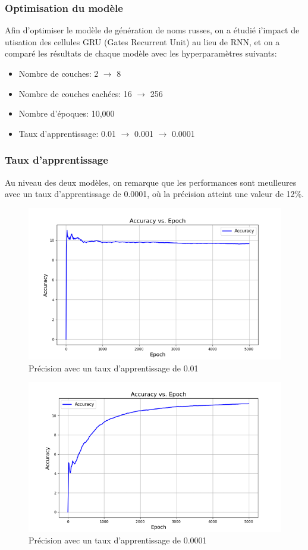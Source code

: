 \subsubsection{Optimisation du modèle}
Afin d'optimiser le modèle de génération de noms russes, on a étudié i'impact de utisation des cellules GRU (Gates Recurrent Unit) \cite{pytorch_gru} au lieu de RNN, et on a comparé les résultats de chaque modèle avec les hyperparamètres suivants:
\begin{itemize}
    \item Nombre de couches: 2 $\rightarrow$ 8
    \item Nombre de couches cachées: 16 $\rightarrow$ 256
    \item Nombre d'époques: 10,000
    \item Taux d'apprentissage: 0.01 $\rightarrow$ 0.001 $\rightarrow$ 0.0001
\end{itemize}

\subsubsection{Taux d'apprentissage}
Au niveau des deux modèles, on remarque que les performances sont meulleures avec un taux d'apprentissage de 0.0001, où la précision atteint une valeur de 12\%.
\begin{figure}[H]
    \centering
    \includegraphics[width=.8\textwidth]{figures/0_01.png}
    \caption{Précision avec un taux d'apprentissage de 0.01}
    \label{fig:0_01}
\end{figure}

\begin{figure}[H]
    \centering
    \includegraphics[width=.8\textwidth]{figures/0_0001.png}
    \caption{Précision avec un taux d'apprentissage de 0.0001}
    \label{fig:0_0001}
\end{figure}

